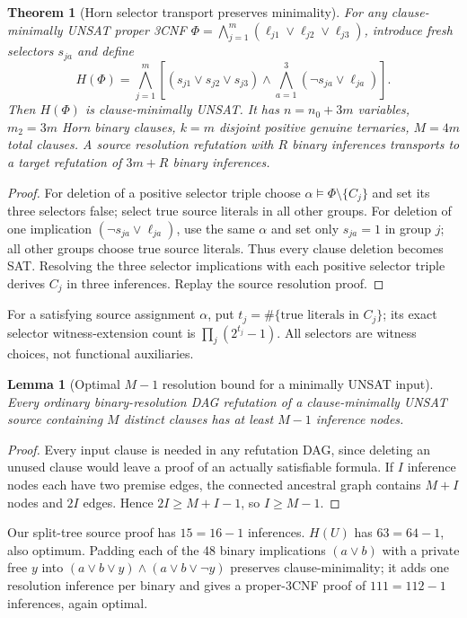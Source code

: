 \documentclass[11pt]{article}
\newtheorem{theorem}{Theorem}
\newtheorem{lemma}{Lemma}
\begin{document}
\begin{theorem}[Horn selector transport preserves minimality]
For any clause-minimally UNSAT proper 3CNF $\Phi=\bigwedge_{j=1}^m(\ell_{j1}\vee\ell_{j2}\vee\ell_{j3})$, introduce fresh selectors $s_{ja}$ and define
\[
H(\Phi)=\bigwedge_{j=1}^m\left[(s_{j1}\vee s_{j2}\vee s_{j3})\wedge
\bigwedge_{a=1}^3(\neg s_{ja}\vee\ell_{ja})\right].
\]
Then $H(\Phi)$ is clause-minimally UNSAT. It has $n=n_0+3m$ variables, $m_2=3m$ Horn binary clauses, $k=m$ disjoint positive genuine ternaries, $M=4m$ total clauses. A source resolution refutation with $R$ binary inferences transports to a target refutation of $3m+R$ binary inferences.
\end{theorem}
\begin{proof}
For deletion of a positive selector triple choose $\alpha\models\Phi\setminus\{C_j\}$ and set its three selectors false; select true source literals in all other groups. For deletion of one implication $(\neg s_{ja}\vee\ell_{ja})$, use the same $\alpha$ and set only $s_{ja}=1$ in group $j$; all other groups choose true source literals. Thus every clause deletion becomes SAT. Resolving the three selector implications with each positive selector triple derives $C_j$ in three inferences. Replay the source resolution proof.
\end{proof}
For a satisfying source assignment $\alpha$, put $t_j=\#\{\text{true literals in }C_j\}$; its exact selector witness-extension count is $\prod_j(2^{t_j}-1)$. All selectors are witness choices, not functional auxiliaries.

\begin{lemma}[Optimal $M-1$ resolution bound for a minimally UNSAT input]
Every ordinary binary-resolution DAG refutation of a clause-minimally UNSAT source containing $M$ distinct clauses has at least $M-1$ inference nodes.
\end{lemma}
\begin{proof}
Every input clause is needed in any refutation DAG, since deleting an unused clause would leave a proof of an actually satisfiable formula. If $I$ inference nodes each have two premise edges, the connected ancestral graph contains $M+I$ nodes and $2I$ edges. Hence $2I\ge M+I-1$, so $I\ge M-1$.
\end{proof}
Our split-tree source proof has $15=16-1$ inferences. $H(U)$ has $63=64-1$, also optimum. Padding each of the 48 binary implications $(a\vee b)$ with a private free $y$ into $(a\vee b\vee y)\wedge(a\vee b\vee\neg y)$ preserves clause-minimality; it adds one resolution inference per binary and gives a proper-3CNF proof of $111=112-1$ inferences, again optimal.
\end{document}
